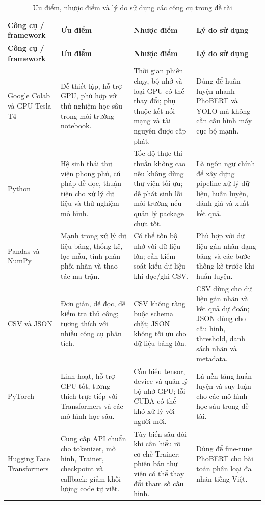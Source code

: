 {\small
\begin{longtable}{|L{0.16\textwidth}|L{0.23\textwidth}|L{0.23\textwidth}|L{0.20\textwidth}|}
\caption{Ưu điểm, nhược điểm và lý do sử dụng các công cụ trong đề tài}
\label{tab:tool_advantage_limitation_reason}\\
\hline
\textbf{Công cụ / framework} & \textbf{Ưu điểm} & \textbf{Nhược điểm} & \textbf{Lý do sử dụng} \\
\hline
\endfirsthead
\hline
\textbf{Công cụ / framework} & \textbf{Ưu điểm} & \textbf{Nhược điểm} & \textbf{Lý do sử dụng} \\
\hline
\endhead
Google Colab và GPU Tesla T4 & Dễ thiết lập, hỗ trợ GPU, phù hợp với thử nghiệm học sâu trong môi trường notebook. & Thời gian phiên chạy, bộ nhớ và loại GPU có thể thay đổi; phụ thuộc kết nối mạng và tài nguyên được cấp phát. & Dùng để huấn luyện nhanh PhoBERT và YOLO mà không cần cấu hình máy cục bộ mạnh. \\ \hline
Python & Hệ sinh thái thư viện phong phú, cú pháp dễ đọc, thuận tiện cho xử lý dữ liệu và thử nghiệm mô hình. & Tốc độ thực thi thuần không cao nếu không dùng thư viện tối ưu; dễ phát sinh lỗi môi trường nếu quản lý package chưa tốt. & Là ngôn ngữ chính để xây dựng pipeline xử lý dữ liệu, huấn luyện, đánh giá và xuất kết quả. \\ \hline
Pandas và NumPy & Mạnh trong xử lý dữ liệu bảng, thống kê, lọc mẫu, tính phân phối nhãn và thao tác ma trận. & Có thể tốn bộ nhớ với dữ liệu lớn; cần kiểm soát kiểu dữ liệu khi đọc/ghi CSV. & Phù hợp với dữ liệu gán nhãn dạng bảng và các bước thống kê trước khi huấn luyện. \\ \hline
CSV và JSON & Đơn giản, dễ đọc, dễ kiểm tra thủ công; tương thích với nhiều công cụ phân tích. & CSV không ràng buộc schema chặt; JSON không tối ưu cho dữ liệu bảng lớn. & CSV dùng cho dữ liệu gán nhãn và kết quả dự đoán; JSON dùng cho cấu hình, threshold, danh sách nhãn và metadata. \\ \hline
PyTorch & Linh hoạt, hỗ trợ GPU tốt, tương thích trực tiếp với Transformers và các mô hình học sâu. & Cần hiểu tensor, device và quản lý bộ nhớ GPU; lỗi CUDA có thể khó xử lý với người mới. & Là nền tảng huấn luyện và suy luận cho các mô hình học sâu trong đề tài. \\ \hline
Hugging Face Transformers & Cung cấp API chuẩn cho tokenizer, mô hình, Trainer, checkpoint và callback; giảm khối lượng code tự viết. & Tùy biến sâu đôi khi cần hiểu rõ cơ chế Trainer; phiên bản thư viện có thể thay đổi tham số cấu hình. & Dùng để fine-tune PhoBERT cho bài toán phân loại đa nhãn tiếng Việt. \\ \hline

\end{longtable}}
